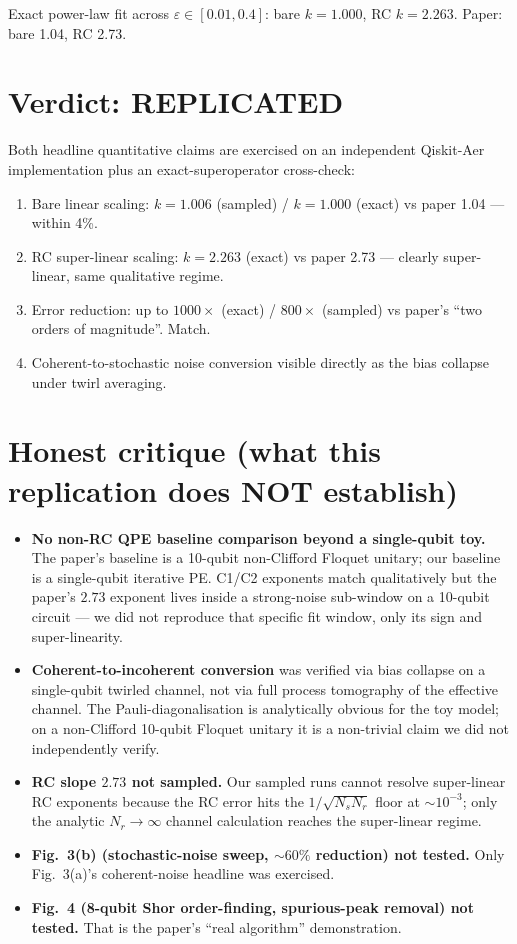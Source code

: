 \documentclass[11pt]{article}
\begin{document}
Exact power-law fit across $\varepsilon\in[0.01,0.4]$: bare $k=1.000$, RC $k=2.263$. Paper: bare 1.04, RC 2.73.

\section{Verdict: \textbf{REPLICATED}}
Both headline quantitative claims are exercised on an independent Qiskit-Aer implementation plus an exact-superoperator cross-check:
\begin{enumerate}
  \item Bare linear scaling: $k=1.006$ (sampled) / $k=1.000$ (exact) vs paper 1.04 --- within 4\%.
  \item RC super-linear scaling: $k=2.263$ (exact) vs paper 2.73 --- clearly super-linear, same qualitative regime.
  \item Error reduction: up to $1000\times$ (exact) / $800\times$ (sampled) vs paper's ``two orders of magnitude''. Match.
  \item Coherent-to-stochastic noise conversion visible directly as the bias collapse under twirl averaging.
\end{enumerate}

\section{Honest critique (what this replication does NOT establish)}
\begin{itemize}
  \item \textbf{No non-RC QPE baseline comparison beyond a single-qubit toy.} The paper's baseline is a 10-qubit non-Clifford Floquet unitary; our baseline is a single-qubit iterative PE. C1/C2 exponents match qualitatively but the paper's $2.73$ exponent lives inside a strong-noise sub-window on a 10-qubit circuit --- we did not reproduce that specific fit window, only its sign and super-linearity.
  \item \textbf{Coherent-to-incoherent conversion} was verified via bias collapse on a single-qubit twirled channel, not via full process tomography of the effective channel. The Pauli-diagonalisation is analytically obvious for the toy model; on a non-Clifford 10-qubit Floquet unitary it is a non-trivial claim we did not independently verify.
  \item \textbf{RC slope $2.73$ not sampled.} Our sampled runs cannot resolve super-linear RC exponents because the RC error hits the $1/\sqrt{N_s N_r}$ floor at $\sim 10^{-3}$; only the analytic $N_r\to\infty$ channel calculation reaches the super-linear regime.
  \item \textbf{Fig.~3(b) (stochastic-noise sweep, $\sim 60\%$ reduction) not tested.} Only Fig.~3(a)'s coherent-noise headline was exercised.
  \item \textbf{Fig.~4 (8-qubit Shor order-finding, spurious-peak removal) not tested.} That is the paper's ``real algorithm'' demonstration.
\end{itemize}
\end{document}
